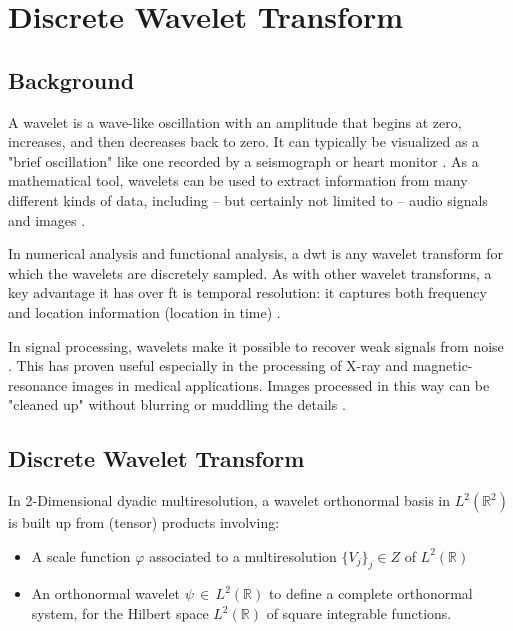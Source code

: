 \section{Discrete Wavelet Transform}

\subsection{Background}
A wavelet is a wave-like oscillation with an amplitude that begins at zero, increases, and then decreases back to zero. It can typically be visualized as a "brief oscillation" like one recorded by a seismograph or heart monitor \cite{lipson2010optical}. As a mathematical tool, wavelets can be used to extract information from many different kinds of data, including – but certainly not limited to – audio signals and images \cite{lovis2014ehealth}.

In numerical analysis and functional analysis, a \gls{dwt} is any wavelet transform for which the wavelets are discretely sampled. As with other wavelet transforms, a key advantage it has over \gls{ft} is temporal resolution: it captures both frequency and location information (location in time) \cite{yan2014machinery}.


In signal processing, wavelets make it possible to recover weak signals from noise . This has proven useful especially in the processing of X-ray and magnetic-resonance images in medical applications. Images processed in this way can be "cleaned up" without blurring or muddling the details \cite{leewavelet}.


\subsection{Discrete Wavelet Transform}
In 2-Dimensional dyadic multiresolution, a wavelet orthonormal basis in $L^2(\mathbb{R}^2)$ is built up from (tensor) products involving:

\begin{itemize}[noitemsep,nolistsep]
	\item A scale function $\varphi$ associated to a multiresolution $\{V_j\}_j\in Z$ of $L^2(\mathbb{R})$
	\item An orthonormal wavelet $\psi \,\in\, L^2(\mathbb{R})$  to define a complete
	orthonormal system, for the	Hilbert space
	\(\scriptstyle L^2\left(\mathbb{R}\right)\) of
	square integrable functions.
\end{itemize}

